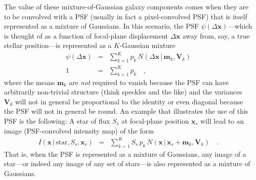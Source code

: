 \documentclass[12pt,pdftex,preprint]{aastex}
\newcommand{\tmatrix}[1]{\boldsymbol{#1}}
\newcommand{\tvector}[1]{\boldsymbol{#1}}
\newcommand{\pos}{\tvector{x}}
\newcommand{\mean}{\tvector{m}}
\newcommand{\var}{\tmatrix{V}\!}
\newcommand{\normal}{N}
\newcommand{\given}{\,|\,}
\renewcommand{\star}{\mathrm{star}}
\begin{document}
The value of these mixture-of-Gaussian galaxy components comes when
they are to be convolved with a PSF (usually in fact a pixel-convolved
PSF) that is itself represented as a mixture of Gaussians.  In this
scenario, the PSF $\psi(\Delta\pos)$---which is thought of as a
function of focal-plane displacement $\Delta\pos$ away from, say, a
true stellar position---is represented as a $K$-Gaussian mixture
\begin{eqnarray}\displaystyle
\psi(\Delta\pos) &=& \sum_{k=1}^K p_k\,\normal(\Delta\pos\given\mean_k,\var_k)
\\
1 &=& \sum_{k=1}^K p_k
\quad ,
\end{eqnarray}
where the means $\mean_k$ are \emph{not} required to vanish because
the PSF can have arbitrarily non-trivial structure (think speckles and
the like) and the variances $\var_k$ will not in general be
proportional to the identity or even diagonal because the PSF will not
in general be round.  An example that illustrates the use of this PSF
is the following: A star of flux $S_s$ at focal-plane position
$\pos_s$ will lead to an image (PSF-convolved intensity map) of the
form
\begin{eqnarray}\displaystyle
I(\pos\given\star,S_s,\pos_s) &=& \sum_{k=1}^K S_s\,p_k\,\normal(\pos\given\pos_s+\mean_k,\var_k)
\quad .
\end{eqnarray}
That is, when the PSF is represented as a mixture of Gaussians, any
image of a star---or indeed any image of any set of stars---is also
represented as a mixture of Gaussians.
\end{document}
